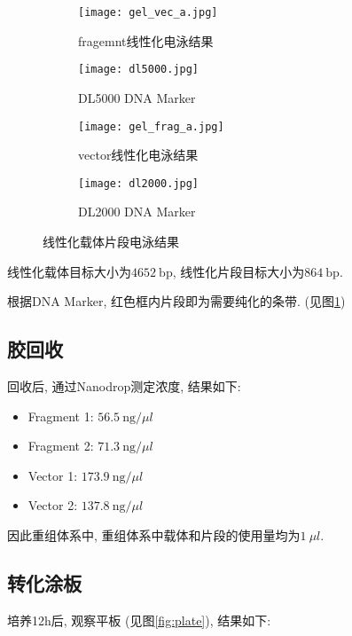 \documentclass{article}
\begin{document}
\begin{figure}[htbp]
    \centering
    \begin{subfigure}[b]{0.5\textwidth}
      \texttt{[image: gel\_vec\_a.jpg]}
      \caption{fragemnt线性化电泳结果}
    \end{subfigure}
    \hfill
    \begin{subfigure}[b]{0.3\textwidth}
      \texttt{[image: dl5000.jpg]}
      \caption{DL5000 DNA Marker}
    \end{subfigure}
    \vspace{0.5cm}
    \begin{subfigure}[b]{0.5\textwidth}
      \texttt{[image: gel\_frag\_a.jpg]}
      \caption{vector线性化电泳结果}
    \end{subfigure}
    \hfill
    \begin{subfigure}[b]{0.3\textwidth}
      \texttt{[image: dl2000.jpg]}
      \caption{DL2000 DNA Marker}
    \end{subfigure}
    \caption{线性化载体片段电泳结果}
    \label{fig:gel1}
\end{figure}

线性化载体目标大小为$4652\ \mbox{bp}$, 线性化片段目标大小为$864\ \mbox{bp}$.

根据DNA Marker, 红色框内片段即为需要纯化的条带. (见图\ref{fig:gel1})

\subsection{胶回收}

回收后, 通过Nanodrop测定浓度, 结果如下:

\begin{itemize}
    \item Fragment 1: $56.5\ \mbox{ng}/\mu l$
    \item Fragment 2: $71.3\ \mbox{ng}/\mu l$
    \item Vector 1: $173.9\ \mbox{ng}/\mu l$
    \item Vector 2: $137.8\ \mbox{ng}/\mu l$
\end{itemize}

因此重组体系中, 重组体系中载体和片段的使用量均为$1\ \mu l$.

\subsection{转化涂板}

培养12h后, 观察平板 (见图\ref{fig:plate}), 结果如下:
\end{document}
